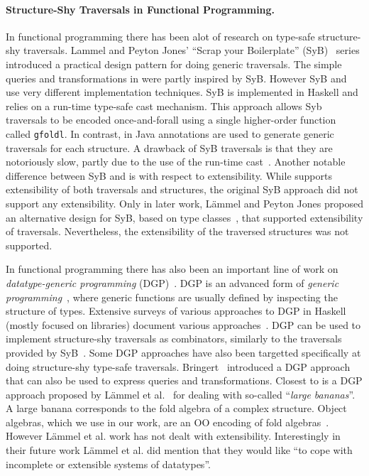 
\paragraph{Structure-Shy Traversals in Functional Programming.}

In
functional programming there has been alot of research on type-safe
structure-shy traversals. Lammel and Peyton Jones' ``Scrap your
Boilerplate'' (SyB)~\cite{ralf03syb,lammel04syb,lammel05syb} series
introduced a practical design pattern for doing generic
traversals. The simple queries and transformations in
\name were partly inspired by SyB. However SyB and \name use very
different implementation techniques. SyB is implemented in Haskell and
relies on a run-time type-safe cast mechanism. This approach allows
Syb traversals to be encoded once-and-forall using a single
higher-order function called \lstinline{gfoldl}. In contrast, in \name
Java annotations are used to generate generic traversals for each
structure. A drawback of SyB traversals is that they are notoriously
slow, partly due to the use of the run-time
cast~\cite{adams2012tyb}. Another notable difference between SyB and
\name is with respect to extensibility. While \name supports
extensibility of both traversals and structures, the original SyB
approach did not support any extensibility. Only in later work,
L\"ammel and Peyton Jones proposed an alternative design for SyB,
based on type classes~\cite{wadler89type-classes}, that supported
extensibility of traversals. Nevertheless, the extensibility of the
traversed structures was not supported.

In functional programming there has also been an important line of
work on \emph{datatype-generic programming} (DGP)~\cite{Gibbons07dgp}.  DGP is an
advanced form of \emph{generic programming}~\cite{GP}, where generic
functions are usually defined by inspecting the structure of
types.  Extensive surveys of various approaches to DGP in Haskell
(mostly focused on libraries) document various
approaches~\cite{ComparingGPHaskellRodriquez,ComparingGPHaskellHinze}.
DGP can be used to implement structure-shy traversals as combinators,
similarly to the traversals provided by SyB~\cite{hinze2003fun}. 
Some DGP approaches have also been targetted specifically at doing 
structure-shy type-safe traversals. Bringert~\cite{bjorn08acf}
introduced a DGP approach that can also be used to express queries 
and transformations. Closest to \name is a DGP approach proposed by 
L\"ammel et al.~\cite{lammel00dealing} for dealing with so-called
``\emph{large bananas}''. A large banana corresponds to the fold
algebra of a complex structure. Object algebras, which we use in our 
work, are an OO encoding of fold algebras~\cite{Oliveira08visitor,bruno12oa}.
However L\"ammel et al. work has not dealt with extensibility. Interestingly 
in their future work  L\"ammel et al. did mention that they would like ``to cope 
with incomplete or extensible systems of datatypes''. 

